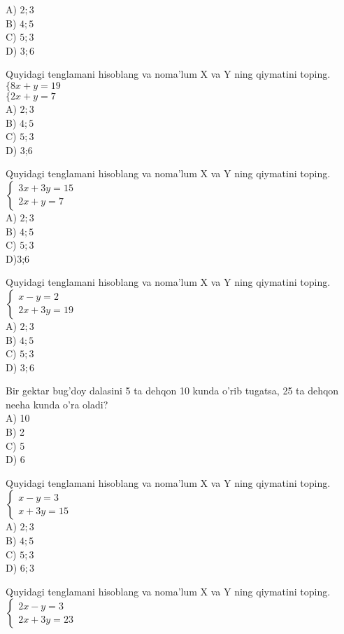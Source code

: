 A) $2 ; 3$\\
B) $4 ; 5$\\
C) $5 ; 3$\\
D) $3 ; 6$
  \item Quyidagi tenglamani hisoblang va noma'lum X va Y ning qiymatini toping. $\{8 x+y=19$\\
$\{2 x+y=7$\\
A) $2 ; 3$\\
B) $4 ; 5$\\
C) $5 ; 3$\\
D) 3;6
  \item Quyidagi tenglamani hisoblang va noma'lum X va Y ning qiymatini toping. $\left\{\begin{array}{c}3 x+3 y=15 \\ 2 x+y=7\end{array}\right.$\\
A) $2 ; 3$\\
B) $4 ; 5$\\
C) $5 ; 3$\\
D)3;6
  \item Quyidagi tenglamani hisoblang va noma'lum X va Y ning qiymatini toping. $\left\{\begin{array}{c}x-y=2 \\ 2 x+3 y=19\end{array}\right.$\\
A) $2 ; 3$\\
B) $4 ; 5$\\
C) $5 ; 3$\\
D) $3 ; 6$
  \item Bir gektar bug'doy dalasini 5 ta dehqon 10 kunda o'rib tugatsa, 25 ta dehqon neeha kunda o'ra oladi?\\
A) 10\\
B) 2\\
C) 5\\
D) 6
  \item Quyidagi tenglamani hisoblang va noma'lum X va Y ning qiymatini toping. $\left\{\begin{array}{c}x-y=3 \\ x+3 y=15\end{array}\right.$\\
A) $2 ; 3$\\
B) $4 ; 5$\\
C) $5 ; 3$\\
D) $6 ; 3$
  \item Quyidagi tenglamani hisoblang va noma'lum X va Y ning qiymatini toping. $\left\{\begin{array}{c}2 x-y=3 \\ 2 x+3 y=23\end{array}\right.$\\
